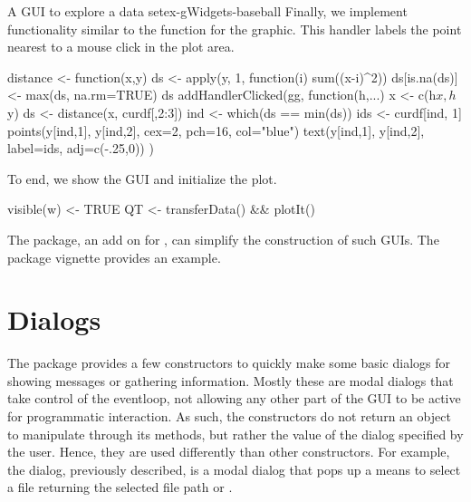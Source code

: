 \begin{example}{A GUI to explore a data set}{ex-gWidgets-baseball}
Finally, we implement functionality similar to the 
function for the graphic. This handler labels the point nearest to a mouse click in
the plot area.
\begin{Schunk}
\begin{Sinput}
 distance <- function(x,y)  {
   ds <- apply(y, 1, function(i) sum((x-i)^2))
   ds[is.na(ds)] <- max(ds, na.rm=TRUE)
   ds
 }
 addHandlerClicked(gg, function(h,...) {
   x <- c(h$x, h$y)
   ds <- distance(x, curdf[,2:3])
   ind <- which(ds == min(ds))
   ids <- curdf[ind, 1]
   points(y[ind,1], y[ind,2], cex=2, pch=16, col="blue")
   text(y[ind,1], y[ind,2], label=ids, adj=c(-.25,0))
 })
\end{Sinput}
\end{Schunk}

To end, we show the GUI and initialize the plot.
\begin{Schunk}
\begin{Sinput}
 visible(w) <- TRUE
 QT <- transferData() && plotIt()
\end{Sinput}
\end{Schunk}

The  package, an add on for , can simplify
the construction of such GUIs. The package vignette provides an example.
\end{example}


\section{Dialogs}
\label{sec:gWidgets-modal-dialogs}

The  package provides a few constructors to quickly make
some basic  dialogs for showing messages or gathering
information. Mostly these are modal dialogs that take control of the
eventloop, not allowing any other part of the GUI to be active for
programmatic interaction. As such, the constructors do not return an
object to manipulate through its methods, but rather the value of the
dialog specified by the user. Hence, they are used differently than
other constructors. For example, the  dialog, previously described, is
a modal dialog that pops up a means to select a file returning
the selected file path or .


